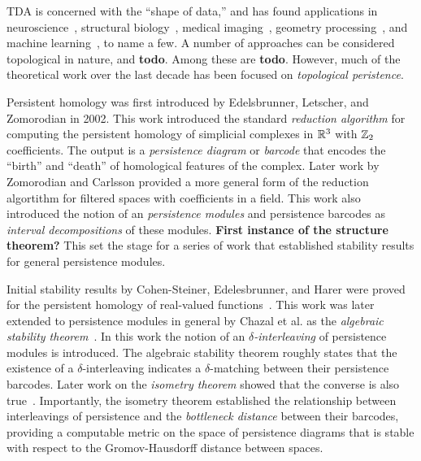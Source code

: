 
TDA is concerned with the ``shape of data,'' and has found applications in
neuroscience~\cite{saggar2018towards, sizemore2019importance},
structural biology~\cite{gameiro2015topological,kovacev2016using,dey2018protein},
medical imaging~\cite{carlsson2008local,robins2011theory,bendich2016persistent},
geometry processing~\cite{skraba2010persistence,poulenard2018topological,bruel2020topology},
and machine learning~\cite{clough2019explicit,chen2019topological,carlsson2020topological,gabrielsson2020topology}, to name a few.
A number of approaches can be considered topological in nature, and \textbf{todo}.
Among these are \textbf{todo}.
However, much of the theoretical work over the last decade has been focused on \emph{topological peristence}.

Persistent homology was first introduced by Edelsbrunner, Letscher, and Zomorodian in 2002\cite{edelsbrunner02simplification}.
This work introduced the standard \emph{reduction algorithm} for computing the persistent homology of simplicial complexes in $\mathbb{R}^3$ with $\mathbb{Z}_2$ coefficients.
The output is a \emph{persistence diagram} or \emph{barcode} that encodes the ``birth'' and ``death'' of homological features of the complex.
Later work by Zomorodian and Carlsson provided a more general form of the reduction algortithm for filtered spaces with coefficients in a field\cite{zomorodian05computing}.
This work also introduced the notion of an \emph{persistence modules} and persistence barcodes as \emph{interval decompositions} of these modules.
\textbf{First instance of the structure theorem?}
This set the stage for a series of work that established stability results for general persistence modules.

Initial stability results by Cohen-Steiner, Edelesbrunner, and Harer were proved for the persistent homology of real-valued functions~\cite{cohensteiner07stability}.
This work was later extended to persistence modules in general by Chazal et al. as the \emph{algebraic stability theorem}~\cite{chazal09proximity}.
In this work the notion of an \emph{$\delta$-interleaving} of persistence modules is introduced.
The algebraic stability theorem roughly states that the existence of a $\delta$-interleaving indicates a $\delta$-matching between their persistence barcodes.
Later work on the \emph{isometry theorem} showed that the converse is also true~\cite{todo}.
Importantly, the isometry theorem established the relationship between interleavings of persistence and the \emph{bottleneck distance} between their barcodes, providing a computable metric on the space of persistence diagrams that is stable with respect to the Gromov-Hausdorff distance between spaces.

